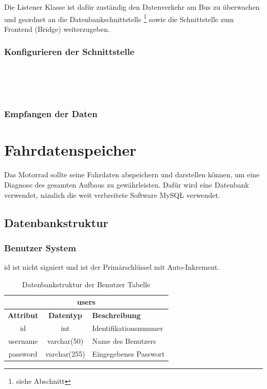 Die Listener Klasse ist dafür zuständig den Datenverkehr am Bus zu überwachen und geordnet an die Datenbankschnittstelle \footnote{siehe Abschnitt} sowie die Schnittstelle zum Frontend (Bridge) weiterzugeben.

\subsubsection{Konfigurieren der Schnittstelle}
	
\begin{lstlisting}[language=Python, caption={Konfigurieren des CAN Adapters},captionpos=b]
	

	
\end{lstlisting}

\subsubsection{Empfangen der Daten}



\newpage


\section{Fahrdatenspeicher}

Das Motorrad sollte seine Fahrdaten abspeichern und darstellen können, um eine Diagnose des gesamten Aufbaus zu gewährleisten. Dafür wird eine Datenbank verwendet, nämlich die weit verbreitete Software MySQL verwendet.

\subsection{Datenbankstruktur}

\subsubsection{Benutzer System}

id ist nicht signiert und ist der Primärschlüssel mit Auto-Inkrement.

\begin{table}[H]
	\begin{center}
		\begin{tabular}{|c|c|l|}
		\hline
		\multicolumn{3}{|c|}{\textbf{users}}                          \\ \hline
		\textbf{Attribut} & \textbf{Datentyp} & \textbf{Beschreibung} \\ \hline
		id                & int               & Identifikationsnummer \\ \hline
		username          & varchar(50)       & Name des Benutzers    \\ \hline
		password          & varchar(255)      & Eingegebenes Passwort \\ \hline
		\end{tabular}
		\caption{Datenbankstruktur der Benutzer Tabelle}
		\label{tab:logindata}
	\end{center}
\end{table}

